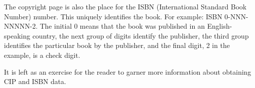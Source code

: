\documentclass[10pt,a4paper,extrafontsizes]{memoir}
\begin{document}
\begin{paracol}{2}
    The copyright page is also the place for the ISBN 
(International
Standard Book Number) number. This uniquely identifies the book. For example:
ISBN 0-NNN-NNNNN-2. The initial 0 means that the book was published in an
English-speaking country, the next group of digits identify the publisher,
the third group identifies the particular book by the publisher, and the final
digit, 2 in the example, is a check digit.

    It is left as an exercise for the reader to garner more information about
obtaining CIP and ISBN data.
\end{paracol}

\section{\prMainmatter}
\end{document}
